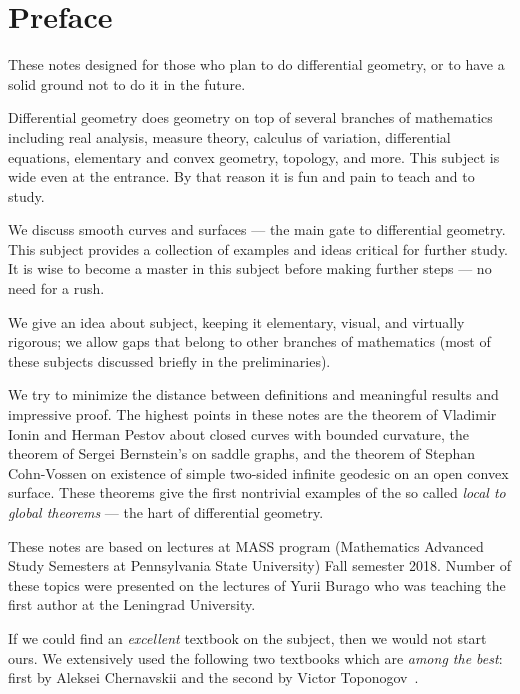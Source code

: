 
\chapter*{Preface}

These notes designed for those who plan to do differential geometry,
or to have a solid ground not to do it in the future.

Differential geometry does geometry on top of several branches of mathematics including 
real analysis, 
measure theory,
calculus of variation,
differential equations,
elementary and convex geometry,
topology, and more.
This subject is wide even at the entrance. 
By that reason it is fun and pain to teach and to study.

We discuss smooth curves and surfaces --- the main gate to differential geometry.
This subject provides a collection of examples and ideas critical for further study.
It is wise to become a master in this subject before making further steps --- no need for a rush.

We give an idea about subject, keeping it elementary, visual, and virtually rigorous; we allow gaps that belong to other branches of mathematics (most of these subjects discussed briefly in the preliminaries).

We try to minimize the distance between definitions and meaningful results and impressive proof.
The highest points in these notes are
the theorem of Vladimir Ionin and Herman Pestov about closed curves with bounded curvature,
the theorem of Sergei Bernstein's on saddle graphs,
and the theorem of Stephan Cohn-Vossen on existence of simple two-sided infinite geodesic on an open convex surface.
These theorems give the first nontrivial examples of the so called {}\emph{local to global theorems} --- the hart of differential geometry.

These notes are based on lectures at MASS program (Mathematics Advanced Study Semesters at Pennsylvania State University) Fall semester 2018.
Number of these topics were presented on the lectures of Yurii Burago who was teaching the first author at the Leningrad University.

If we could find an \emph{excellent} textbook on the subject, then we would not start ours.
We extensively used the following two textbooks which are \emph{among the best}: first by Aleksei Chernavskii \cite{chernavsky} and the second by Victor Toponogov~\cite{toponogov}.



\newpage
\tableofcontents
